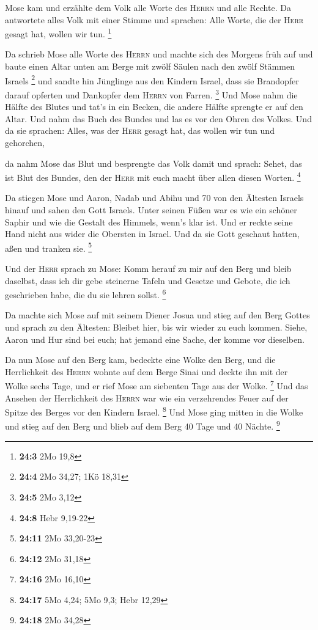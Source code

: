  Mose kam und erzählte dem Volk alle Worte des
\textsc{Herrn} und alle Rechte. Da antwortete alles Volk mit einer
Stimme und sprachen: Alle Worte, die der \textsc{Herr} gesagt hat,
wollen wir tun. \footnote{\textbf{24:3} 2Mo 19,8}

 Da schrieb Mose alle Worte des \textsc{Herrn} und machte
sich des Morgens früh auf und baute einen Altar unten am Berge mit zwölf
Säulen nach den zwölf Stämmen Israels \footnote{\textbf{24:4} 2Mo 34,27;
  1Kö 18,31}  und sandte hin Jünglinge aus den Kindern
Israel, dass sie Brandopfer darauf opferten und Dankopfer dem
\textsc{Herrn} von Farren. \footnote{\textbf{24:5} 2Mo 3,12}
 Und Mose nahm die Hälfte des Blutes und tat's in ein
Becken, die andere Hälfte sprengte er auf den Altar.  Und
nahm das Buch des Bundes und las es vor den Ohren des Volkes. Und da sie
sprachen: Alles, was der \textsc{Herr} gesagt hat, das wollen wir tun
und gehorchen,

 da nahm Mose das Blut und besprengte das Volk damit und
sprach: Sehet, das ist Blut des Bundes, den der \textsc{Herr} mit euch
macht über allen diesen Worten. \footnote{\textbf{24:8} Hebr 9,19-22}

 Da stiegen Mose und Aaron, Nadab und Abihu und 70 von den
Ältesten Israels hinauf  und sahen den Gott Israels.
Unter seinen Füßen war es wie ein schöner Saphir und wie die Gestalt des
Himmels, wenn's klar ist.  Und er reckte seine Hand nicht
aus wider die Obersten in Israel. Und da sie Gott geschaut hatten, aßen
und tranken sie. \footnote{\textbf{24:11} 2Mo 33,20-23}

 Und der \textsc{Herr} sprach zu Mose: Komm herauf zu mir
auf den Berg und bleib daselbst, dass ich dir gebe steinerne Tafeln und
Gesetze und Gebote, die ich geschrieben habe, die du sie lehren sollst.
\footnote{\textbf{24:12} 2Mo 31,18}

 Da machte sich Mose auf mit seinem Diener Josua und
stieg auf den Berg Gottes  und sprach zu den Ältesten:
Bleibet hier, bis wir wieder zu euch kommen. Siehe, Aaron und Hur sind
bei euch; hat jemand eine Sache, der komme vor dieselben.

 Da nun Mose auf den Berg kam, bedeckte eine Wolke den
Berg,  und die Herrlichkeit des \textsc{Herrn} wohnte auf
dem Berge Sinai und deckte ihn mit der Wolke sechs Tage, und er rief
Mose am siebenten Tage aus der Wolke. \footnote{\textbf{24:16} 2Mo 16,10}
 Und das Ansehen der Herrlichkeit des \textsc{Herrn} war
wie ein verzehrendes Feuer auf der Spitze des Berges vor den Kindern
Israel. \footnote{\textbf{24:17} 5Mo 4,24; 5Mo 9,3; Hebr 12,29}
 Und Mose ging mitten in die Wolke und stieg auf den Berg
und blieb auf dem Berg 40 Tage und 40 Nächte. \footnote{\textbf{24:18}
  2Mo 34,28}

